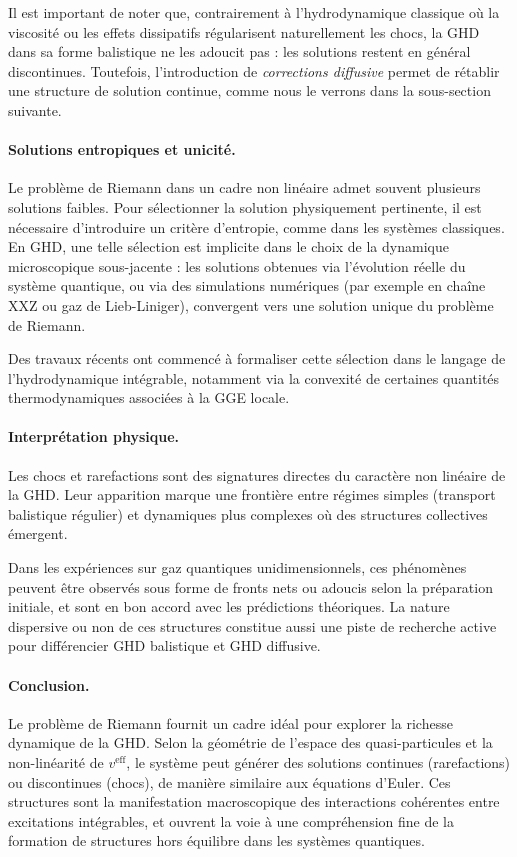 Il est important de noter que, contrairement à l’hydrodynamique classique où la viscosité ou les effets dissipatifs régularisent naturellement les chocs, la GHD dans sa forme balistique ne les adoucit pas : les solutions restent en général discontinues. Toutefois, l’introduction de \emph{corrections diffusive} permet de rétablir une structure de solution continue, comme nous le verrons dans la sous-section suivante.

\paragraph{Solutions entropiques et unicité.}
Le problème de Riemann dans un cadre non linéaire admet souvent plusieurs solutions faibles. Pour sélectionner la solution physiquement pertinente, il est nécessaire d’introduire un critère d’entropie, comme dans les systèmes classiques. En GHD, une telle sélection est implicite dans le choix de la dynamique microscopique sous-jacente : les solutions obtenues via l’évolution réelle du système quantique, ou via des simulations numériques (par exemple en chaîne XXZ ou gaz de Lieb-Liniger), convergent vers une solution unique du problème de Riemann.

Des travaux récents ont commencé à formaliser cette sélection dans le langage de l’hydrodynamique intégrable, notamment via la convexité de certaines quantités thermodynamiques associées à la GGE locale.

\paragraph{Interprétation physique.}
Les chocs et rarefactions sont des signatures directes du caractère non linéaire de la GHD. Leur apparition marque une frontière entre régimes simples (transport balistique régulier) et dynamiques plus complexes où des structures collectives émergent.

Dans les expériences sur gaz quantiques unidimensionnels, ces phénomènes peuvent être observés sous forme de fronts nets ou adoucis selon la préparation initiale, et sont en bon accord avec les prédictions théoriques. La nature dispersive ou non de ces structures constitue aussi une piste de recherche active pour différencier GHD balistique et GHD diffusive.

\paragraph{Conclusion.}
Le problème de Riemann fournit un cadre idéal pour explorer la richesse dynamique de la GHD. Selon la géométrie de l’espace des quasi-particules et la non-linéarité de $v^{\mathrm{eff}}$, le système peut générer des solutions continues (rarefactions) ou discontinues (chocs), de manière similaire aux équations d’Euler. Ces structures sont la manifestation macroscopique des interactions cohérentes entre excitations intégrables, et ouvrent la voie à une compréhension fine de la formation de structures hors équilibre dans les systèmes quantiques.


